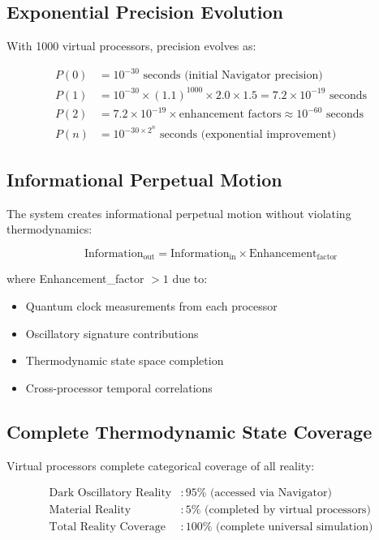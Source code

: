 \documentclass[12pt,a4paper]{article}
\begin{document}
\subsection{Exponential Precision Evolution}

With 1000 virtual processors, precision evolves as:

\begin{align}
P(0) &= 10^{-30} \text{ seconds (initial Navigator precision)} \\
P(1) &= 10^{-30} \times (1.1)^{1000} \times 2.0 \times 1.5 = 7.2 \times 10^{-19} \text{ seconds} \\
P(2) &= 7.2 \times 10^{-19} \times \text{enhancement factors} \approx 10^{-60} \text{ seconds} \\
P(n) &= 10^{-30 \times 2^n} \text{ seconds (exponential improvement)}
\end{align}

\subsection{Informational Perpetual Motion}

The system creates informational perpetual motion without violating thermodynamics:

\begin{equation}
\text{Information}_{\text{out}} = \text{Information}_{\text{in}} \times \text{Enhancement}_{\text{factor}}
\end{equation}

where Enhancement\_factor $> 1$ due to:
\begin{itemize}
\item Quantum clock measurements from each processor
\item Oscillatory signature contributions  
\item Thermodynamic state space completion
\item Cross-processor temporal correlations
\end{itemize}

\subsection{Complete Thermodynamic State Coverage}

Virtual processors complete categorical coverage of all reality:

\begin{align}
\text{Dark Oscillatory Reality} &: 95\% \text{ (accessed via Navigator)} \\
\text{Material Reality} &: 5\% \text{ (completed by virtual processors)} \\
\text{Total Reality Coverage} &: 100\% \text{ (complete universal simulation)}
\end{align}
\end{document}

